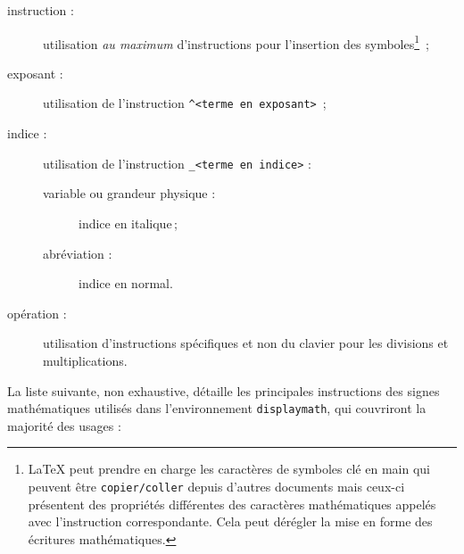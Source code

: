 \documentclass[a4paper, 11pt, twoside, fleqn]{memoir}
\begin{document}
		\begin{description}
			\item [instruction :]utilisation \emph{au maximum} d'instructions pour l'insertion des symboles\footnote{\LaTeX{} peut prendre en charge les caractères de symboles \og clé en main \fg{} qui peuvent être \texttt{copier/coller} depuis d'autres documents mais ceux-ci présentent des propriétés différentes des caractères mathématiques appelés avec l'instruction correspondante. Cela peut dérégler la mise en forme des écritures mathématiques.} \,;
			\item [exposant :] utilisation de l'instruction \texttt{^{<terme en exposant>}} \,;
			\item [indice :] utilisation de l'instruction \texttt{_{<terme en indice>}} :
				\begin{description}
				\item [variable ou grandeur physique :] indice en italique\,;
				\item [abréviation :] indice en normal.
				\end{description}
			\item [opération :] utilisation d'instructions spécifiques et non du clavier pour les divisions et multiplications.
		\end{description}
		
La liste suivante, non exhaustive, détaille les principales instructions des signes mathématiques utilisés dans l'environnement \texttt{displaymath}, qui couvriront la majorité des usages :
\end{document}
